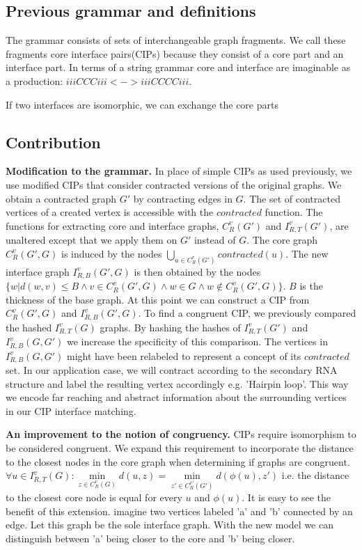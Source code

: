\documentclass{article}
\begin{document}
\subsection{Previous grammar and definitions}

The grammar consists of sets of interchangeable graph fragments.
We call these fragments core interface pairs(CIPs) because 
they consist of a core part and an interface part.
In terms of a string grammar core and interface are imaginable 
as a production: $iiiCCCiii <-> iiiCCCCiii$. 

If two interfaces are isomorphic, we can exchange the core parts


\subsection{Contribution}
\textbf{Modification to the grammar.}
In place of simple CIPs as used previously,
we use modified CIPs that consider contracted versions
of the original graphs. We obtain a contracted graph $G'$ by contracting edges
in $G$. The set of contracted vertices of a
created vertex is accessible with the $contracted$ function.
The functions for extracting core and interface graphs, 
$C_{R}^v(G')$ and $I_{R,T}^v(G')$, are unaltered except that we apply them
on $G'$ instead of $G$. 
The core graph $C_{R}^v(G',G)$ is induced by the nodes 
$\bigcup\limits_{u \in C_R^v(G')} contracted(u)$.
The new interface graph $I_{R,B}^v(G',G)$ is then obtained by the nodes 
$\{ w | d(w,v) \leq B \wedge v\in C_R^v(G',G) \wedge w \in G \wedge w 
\notin C_R^v(G',G) \}$.  $B$ is the thickness of the base graph. 
At this point we can construct a CIP from $C_R^v(G',G)$ and $I_{R,B}^v(G',G)$. 
To find a congruent CIP, we previously compared the hashed $I_{R,T}^v(G)$ 
graphs. By hashing the hashes of $I_{R,T}^v(G')$ and $I_{R,B}^v(G,G')$ we 
increase the specificity of this comparison. The vertices in $I_{R,B}^v(G,G')$ 
might have been relabeled to represent a concept of its $contracted$ set. In 
our application case, we will contract according to the 
secondary RNA structure and label the resulting vertex accordingly e.g.
'Hairpin loop'. This way we encode far reaching and abstract 
information about the surrounding vertices in our CIP interface matching.


\textbf{An improvement to the notion of congruency.}
CIPs require isomorphism to be considered congruent.
We expand this requirement to incorporate
the distance to the closest nodes in the core graph when 
determining if graphs are congruent.
$\forall u \in I_{R,T}^v(G) : 
\underset{z \in  C_{R}^v(G)}{\min} d(u,z) = 
\underset{z' \in  C_{R}^{v'}(G')}{\min} d(\phi(u),z') $ i.e. the distance 
to the closest core node is equal for every
$u$ and $\phi(u)$.
It is easy to see the benefit of this extension.
imagine two vertices labeled 'a' and 'b' connected by an edge. Let this graph
be the sole interface graph. With the new model we can distinguish 
between 'a' being closer to the core and 'b' being closer. 
\end{document}
